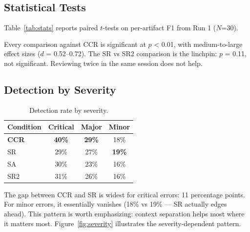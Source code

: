 \documentclass[11pt]{article}
\begin{document}
\subsection{Statistical Tests}

Table~\ref{tab:stats} reports paired $t$-tests on per-artifact F1 from Run 1 ($N$=30).

\begin{table}[h]
\centering
\small
{}
\caption{Statistical comparisons (paired $t$-test, Run 1).}
\label{tab:stats}
\end{table}

Every comparison against CCR is significant at $p$ < 0.01, with medium-to-large effect sizes ($d$ = 0.52--0.72). The SR vs SR2 comparison is the linchpin: $p$ = 0.11, not significant. Reviewing twice in the same session does not help.

\subsection{Detection by Severity}

\begin{table}[h]
\centering
\small
\begin{tabular}{lccc}
\toprule
\textbf{Condition} & \textbf{Critical} & \textbf{Major} & \textbf{Minor} \\
\midrule
\textbf{CCR} & \textbf{40\%} & \textbf{29\%} & 18\% \\
SR & 29\% & 27\% & \textbf{19\%} \\
SA & 30\% & 23\% & 16\% \\
SR2 & 31\% & 26\% & 16\% \\
\bottomrule
\end{tabular}
\caption{Detection rate by severity.}
\label{tab:severity}
\end{table}

The gap between CCR and SR is widest for critical errors: 11 percentage points. For minor errors, it essentially vanishes (18\% vs 19\% --- SR actually edges ahead). This pattern is worth emphasizing: context separation helps most where it matters most. Figure~\ref{fig:severity} illustrates the severity-dependent pattern.
\end{document}
